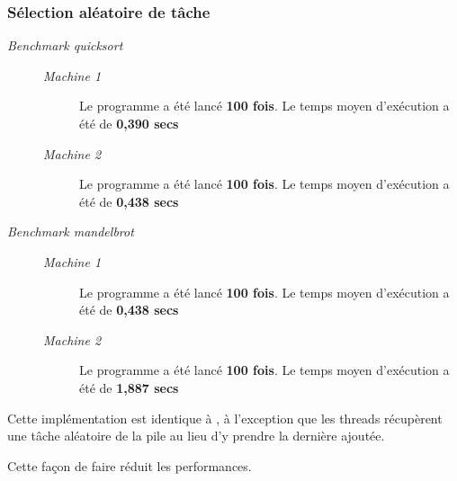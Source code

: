 \documentclass[a4paper]{article}
\newcommand{\docref}[1]{\textit{\nameref{#1}}} %
\def\mone{\textit{Machine 1}} %
\def\mtwo{\textit{Machine 2}} %
\def\bone{\textit{Benchmark quicksort}}
\def\btwo{\textit{Benchmark mandelbrot}}
\begin{document}
\subsubsection{Sélection aléatoire de tâche}
\begin{description}
  \item[\bone] \hspace{1em}
        \begin{description}
          \item[\mone] Le programme a été lancé \textbf{100 fois}.
                Le temps moyen d'exécution a été de \textbf{0,390 secs}
          \item[\mtwo] Le programme a été lancé \textbf{100 fois}.
                Le temps moyen d'exécution a été de \textbf{0,438 secs}
        \end{description}

  \item[\btwo] \hspace{1em}
        \begin{description}
          \item[\mone] Le programme a été lancé \textbf{100 fois}.
                Le temps moyen d'exécution a été de \textbf{0,438 secs}
          \item[\mtwo] Le programme a été lancé \textbf{100 fois}.
                Le temps moyen d'exécution a été de \textbf{1,887 secs}
        \end{description}
\end{description}

Cette implémentation est identique à \docref{stats:stack}, à l'exception que
les threads récupèrent une tâche aléatoire de la pile au lieu d'y prendre
la dernière ajoutée.

Cette façon de faire réduit les performances.
\end{document}
